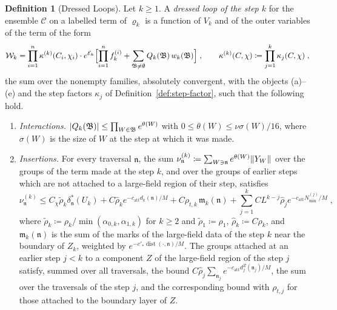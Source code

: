 \documentclass[11pt]{preprint}
\newcommand{\dist}{\operatorname{dist}}
\DeclarePairedDelimiter{\abs}{\lvert}{\rvert}
\DeclarePairedDelimiter{\norm}{\lVert}{\rVert}
\numberwithin{equation}{section}
\theoremstyle{definition}
\newtheorem{definition}[theorem]{Definition}
\theoremstyle{remark}
\theoremstyle{plain}
\begin{document}
\begin{definition}[Dressed Loops]\label{def:dressed-loop}
Let $k \geq 1$. A \emph{dressed loop of the step $k$} for the ensemble $\mathcal C$ on a labelled term of $\varrho_k$ is a function of $V_k$ and of the outer variables of the term of the form
\begin{equation}\label{eq:dressed-loop}
    \mathcal W_k = \prod_{i=1}^{n}\kappa^{(k)}(C_i, \chi_i)\cdot e^{\mathcal E_k}\Bigl[\prod_{i=1}^{n}f^{(i)}_k + \sum_{\mathfrak B \neq \emptyset}Q_k(\mathfrak B)\,w_k(\mathfrak B)\Bigr]\;,
    \qquad
    \kappa^{(k)}(C, \chi) \coloneqq \prod_{j=1}^{k}\kappa_j(C, \chi)\;,
\end{equation}
the sum over the nonempty families, absolutely convergent, with the objects (a)--(e) and the step factors $\kappa_j$ of Definition~\ref{def:step-factor}, such that the following hold.
\begin{enumerate}[label=(\roman*)]
\item \emph{Interactions.} $\abs{Q_k(\mathfrak B)} \leq \prod_{W \in \mathfrak B}e^{\theta(W)}$ with $0 \leq \theta(W) \leq \nu\sigma(W)/16$, where $\sigma(W)$ is the size of $W$ at the step at which it was made.
\item \emph{Insertions.} For every traversal $\mathfrak n$, the sum $\nu^{(k)}_{\mathfrak n} \coloneqq \sum_{W \ni \mathfrak n}e^{\theta(W)}\norm{Y_W}$ over the groups of the term made at the step $k$, and over the groups of earlier steps which are not attached to a large-field region of their step, satisfies
\begin{equation}\label{eq:insertion-bound}
    \nu^{(k)}_{\mathfrak n} \leq C_\chi\tilde\rho_k\delta^{*}_{\mathfrak n}(U_k) + C\hat\rho_ke^{-c_{\mathrm{att}}d_k(\mathfrak n)/M} + C\rho_{t,k}\,\mathfrak m_k(\mathfrak n) + \sum_{j=1}^{k}CL^{k-j}\hat\rho_je^{-c_{\mathrm{att}}N^{(j)}_{\min}/M}\;,
\end{equation}
where $\tilde\rho_k \coloneqq \rho_k/\min(\alpha_{0,k}, \alpha_{1,k})$ for $k \geq 2$ and $\tilde\rho_1 \coloneqq \rho_1$, $\hat\rho_k \coloneqq C\rho_k$, and $\mathfrak m_k(\mathfrak n)$ is the sum of the marks of the large-field data of the step $k$ near the boundary of $Z_k$, weighted by $e^{-c'_*\dist(\cdot, \mathfrak n)/M}$. The groups attached at an earlier step $j < k$ to a component $Z$ of the large-field region of the step $j$ satisfy, summed over all traversals, the bound $C\hat\rho_j\sum_{\mathfrak n_j}e^{-c_{\mathrm{att}}d^Z_j(\mathfrak n_j)/M}$, the sum over the traversals of the step $j$, and the corresponding bound with $\rho_{t,j}$ for those attached to the boundary layer of $Z$.

\end{enumerate}
\end{definition}
\end{document}
